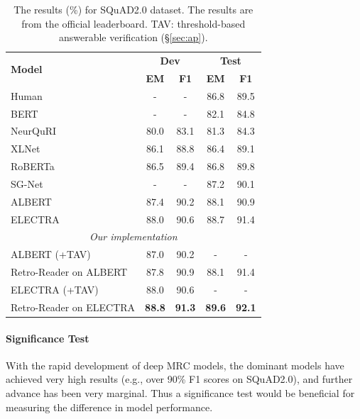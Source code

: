 \documentclass[letterpaper]{article} %
\begin{document}
\begin{table}
\centering
\setlength{\tabcolsep}{5pt}
{
\begin{tabular}{l c c c c }
\toprule
\multirow{2}{*}{\textbf{Model} }& \multicolumn{2}{c}{\textbf{Dev}} & \multicolumn{2}{c}{\textbf{Test}}\\
& \textbf{EM} & \textbf{F1}&   \textbf{EM} & \textbf{F1}\\
\midrule
Human& -  & - & 86.8&    89.5 \\
\midrule
BERT \cite{devlin2018bert} & -  & - &  82.1 &  84.8 \\
NeurQuRI \cite{back2020neurquri} & 80.0  & 83.1 & 81.3  & 84.3 \\
XLNet \cite{yang2019xlnet}& 86.1  & 88.8  & 86.4 &    89.1   \\
RoBERTa \cite{liu2019roberta} & 86.5  & 89.4 &  86.8 &  89.8 \\
SG-Net \cite{zhang2019sg} & -  & - & 87.2 &    90.1 \\
ALBERT \cite{Lan2020ALBERT}& 87.4  & 90.2 & 88.1 &    90.9 \\
ELECTRA \cite{clark2019electra} & 88.0 & 90.6 & 88.7 & 91.4 \\
\midrule
\multicolumn{5}{c}{\emph{Our implementation}} \\
ALBERT (+TAV) & 87.0 & 90.2 & - & -\\
Retro-Reader on ALBERT & 87.8 & 90.9 & 88.1 & 91.4 \\
ELECTRA (+TAV) & 88.0 & 90.6  & -  & - \\
Retro-Reader on ELECTRA & \textbf{88.8} & \textbf{91.3} & \textbf{89.6} & \textbf{92.1} \\
\bottomrule
\end{tabular}
}
\caption{\label{tab:squad2.0} The results (\%) for SQuAD2.0 dataset. The results  are from the official leaderboard.
TAV: threshold-based answerable verification (\S\ref{sec:ap}).
}
\end{table}

\paragraph{Significance Test} With the rapid development of deep MRC models, the dominant models have achieved very high results (e.g., over 90\% F1 scores on SQuAD2.0), and further advance has been very marginal. %
Thus a significance test would be beneficial for measuring the difference in model performance. %
\end{document}
